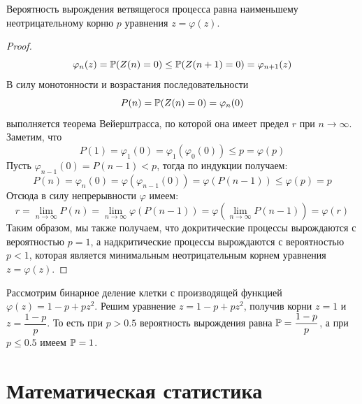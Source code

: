 \documentclass[12pt]{article}
\begin{document}
\begin{theorem}
    Вероятность вырождения ветвящегося процесса равна наименьшему неотрицательному корню $p$ уравнения $z=\varphi(z)$.
\end{theorem}
\begin{proof}
    $$\varphi_n(z)=\mathbb{P}(Z(n)=0)\leq \mathbb{P}(Z(n+1)=0)=\varphi_{n+1}(z)$$
    В силу монотонности и возрастания последовательности
    $$P(n)=\mathbb{P}(Z(n)=0)=\varphi_n(0)$$
    выполняется теорема Вейерштрасса, по которой она имеет предел $r$ при $n\to\infty$. Заметим, что 
    $$P(1)=\varphi_1(0)=\varphi_1(\varphi_0(0))\leq p=\varphi(p)$$
    Пусть $\varphi_{n-1}(0)=P(n-1)<p$, тогда по индукции получаем:
    $$P(n)=\varphi_n(0)=\varphi(\varphi_{n-1}(0))=\varphi(P(n-1))\leq \varphi(p)=p$$
    Отсюда в силу непрерывности $\varphi$ имеем:
    $$r=\lim_{n\to\infty}P(n)=\lim_{n\to\infty}\varphi(P(n-1))=\varphi\left(\lim_{n\to\infty}P(n-1)\right)=\varphi(r)$$
    Таким образом, мы также получаем, что докритические процессы вырождаются с вероятностью $p=1$, а надкритические процессы вырождаются с вероятностью $p<1$, которая является минимальным неотрицательным корнем уравнения $z=\varphi(z)$.
\end{proof}
\begin{example}
    Рассмотрим бинарное деление клетки с производящей функцией $\varphi(z)=1-p+pz^2$. Решим уравнение $z=1-p+pz^2$, получив корни $z=1$ и $z=\dfrac{1-p}{p}$. То есть при $p>\num{0.5}$ вероятность вырождения равна $\mathbb{P}=\dfrac{1-p}{p}$, а при $p\leq\num{0.5}$ имеем $\mathbb{P}=1$.
\end{example}

\section{Математическая статистика}
\end{document}
